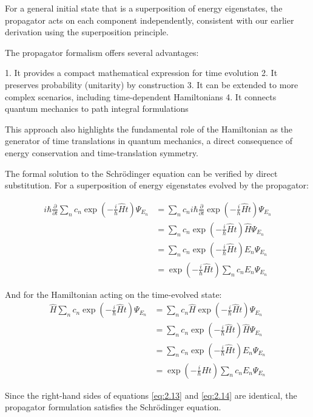 For a general initial state that is a superposition of energy eigenstates, the propagator acts on each component independently, consistent with our earlier derivation using the superposition principle.

The propagator formalism offers several advantages:

1. It provides a compact mathematical expression for time evolution
2. It preserves probability (unitarity) by construction
3. It can be extended to more complex scenarios, including time-dependent Hamiltonians
4. It connects quantum mechanics to path integral formulations

This approach also highlights the fundamental role of the Hamiltonian as the generator of time translations in quantum mechanics, a direct consequence of energy conservation and time-translation symmetry.


The formal solution to the Schrödinger equation can be verified by direct substitution. For a superposition of energy eigenstates evolved by the propagator:

\begin{align}
i\hbar\frac{\partial}{\partial t}\sum_n c_n\exp\left(-\frac{i}{\hbar}\hat{H}t\right)\Psi_{E_n} &= \sum_n c_n i\hbar\frac{\partial}{\partial t}\exp\left(-\frac{i}{\hbar}\hat{H}t\right)\Psi_{E_n} \\
&= \sum_n c_n\exp\left(-\frac{i}{\hbar}\hat{H}t\right)\hat{H}\Psi_{E_n} \\
&= \sum_n c_n\exp\left(-\frac{i}{\hbar}\hat{H}t\right)E_n\Psi_{E_n} \label{eq:2.13} \\
&= \exp\left(-\frac{i}{\hbar}\hat{H}t\right)\sum_n c_nE_n\Psi_{E_n}
\end{align}

And for the Hamiltonian acting on the time-evolved state:
\begin{align}
\hat{H}\sum_n c_n\exp\left(-\frac{i}{\hbar}\hat{H}t\right)\Psi_{E_n} &= \sum_n c_n\hat{H}\exp\left(-\frac{i}{\hbar}\hat{H}t\right)\Psi_{E_n} \\
&= \sum_n c_n\exp\left(-\frac{i}{\hbar}\hat{H}t\right)\hat{H}\Psi_{E_n} \\
&= \sum_n c_n\exp\left(-\frac{i}{\hbar}\hat{H}t\right)E_n\Psi_{E_n} \label{eq:2.14} \\
&= \exp\left(-\frac{i}{\hbar}\hat{H}t\right)\sum_n c_nE_n\Psi_{E_n}
\end{align}

Since the right-hand sides of equations \eqref{eq:2.13} and \eqref{eq:2.14} are identical, the propagator formulation satisfies the Schrödinger equation.

